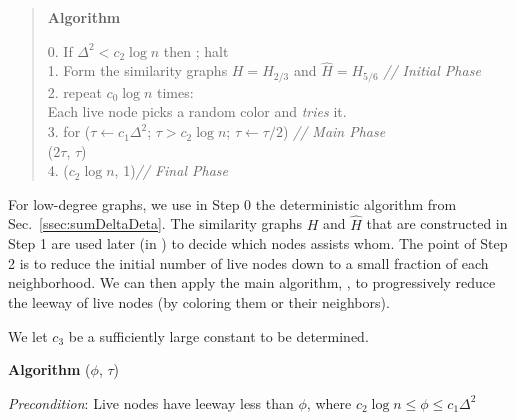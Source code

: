 \begin{quote}
   \textbf{Algorithm} 

   0. If $\Delta^2 < c_2 \log n$ then ; halt \\
   1. Form the similarity graphs $H=H_{2/3}$ and $\hat{H} = H_{5/6}$  \hspace{1cm }\textit{// Initial Phase} \\
   2. repeat $c_0 \log n$ times: \\
   \hspace*{2em} Each live node picks a random color and \emph{tries} it. \\
   3. for ($\tau \leftarrow c_1 \Delta^2$; $\tau > c_2 \log n$; $\tau \leftarrow \tau/2$) \hspace{3cm }\textit{// Main Phase}\\
\hspace*{2em}      ($2 \tau$, $\tau$) \\
    4. ($c_2 \log n$, 1)\hspace{5.75cm}\textit{// Final Phase}
\end{quote}

For low-degree graphs, we use in Step 0 the deterministic algorithm from Sec.~\ref{ssec:sumDeltaDeta}. The similarity graphs $H$ and $\hat{H}$ that are constructed in Step 1 are  used later  (in ) to decide which nodes assists whom. The point of Step 2 is to reduce the initial number of live nodes down to a small fraction of each neighborhood. We can then apply the main algorithm, , to progressively reduce the leeway of live nodes (by coloring them or their neighbors).

We let $c_3$ be a sufficiently large constant to be determined. 
\medskip

   \textbf{Algorithm} ($\phi$, $\tau$)
   
    \emph{Precondition}: Live nodes have leeway less than $\phi$, where $c_2\log n \le \phi \le c_1\Delta^2$
    

